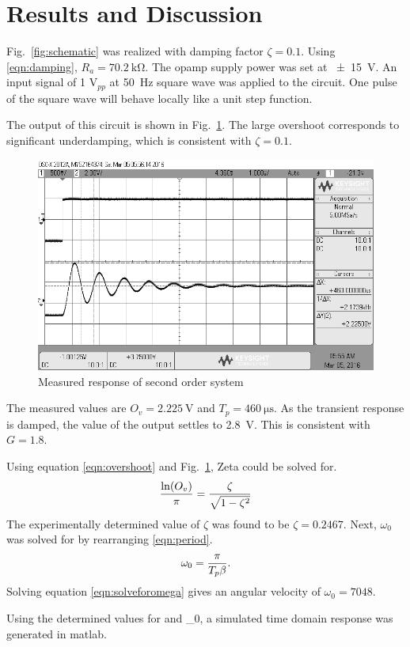 \section{Results and Discussion}\label{sec:results-and-discussion}
Fig.~\ref{fig:schematic} was realized with damping factor $\zeta = 0.1$.
Using \eqref{eqn:damping}, $R_a = \SI{70.2}{\kilo\ohm}$.
The opamp supply power was set at \SI{+-15}{\volt}.
An input signal of 1 $\si{\volt}_{pp}$ at \SI{50}{\hertz} square wave was applied to the circuit.
One pulse of the square wave will behave locally like a unit step function.

The output of this circuit is shown in Fig.~\ref{fig:overshoot}.
The large overshoot corresponds to significant underdamping, which is consistent with $\zeta = 0.1$.

\pagebreak

\begin{figure}[tbph]
	\centering
	\includegraphics[width=0.7\linewidth]{graphics/overshoot}
	\caption{Measured response of second order system}
	\label{fig:overshoot}
\end{figure}

The measured values are $O_v = \SI{2.225}{\volt}$ and $T_p = \SI{460}{\micro\second}$.
As the transient response is damped, the value of the output settles to \SI{2.8}{\volt}.
This is consistent with $G = 1.8$.

Using equation \eqref{eqn:overshoot} and Fig.~\ref{fig:overshoot}, Zeta could be solved for. 
\begin{equation}\label{eqn:solveforzeta}
	{\ln(O_v) \over \pi} = {\zeta \over \sqrt{1 - \zeta^2}}
\end{equation}
The experimentally determined value of $\zeta$ was found to be $\zeta = 0.2467$.
Next, $\omega_0$ was solved for by rearranging \eqref{eqn:period}.
\begin{equation}\label{eqn:solveforomega}
	\omega_0 = { \pi \over T_p\beta }.
\end{equation} 
Solving equation \eqref{eqn:solveforomega} gives an angular velocity of $\omega_0 = 7048$.

Using the determined values for \zeta and \omega_0, a simulated time domain response was generated in matlab.